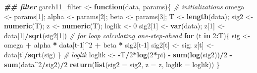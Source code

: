 \documentclass[
]{book}
\newenvironment{Shaded}{\begin{snugshade}}{\end{snugshade}}
\newcommand{\AttributeTok}[1]{\textcolor[rgb]{0.13,0.29,0.53}{#1}}
\newcommand{\CommentTok}[1]{\textcolor[rgb]{0.56,0.35,0.01}{\textit{#1}}}
\newcommand{\ControlFlowTok}[1]{\textcolor[rgb]{0.13,0.29,0.53}{\textbf{#1}}}
\newcommand{\DecValTok}[1]{\textcolor[rgb]{0.00,0.00,0.81}{#1}}
\newcommand{\DocumentationTok}[1]{\textcolor[rgb]{0.56,0.35,0.01}{\textbf{\textit{#1}}}}
\newcommand{\FunctionTok}[1]{\textcolor[rgb]{0.13,0.29,0.53}{\textbf{#1}}}
\newcommand{\NormalTok}[1]{#1}
\newcommand{\OtherTok}[1]{\textcolor[rgb]{0.56,0.35,0.01}{#1}}
\newcommand{\SpecialCharTok}[1]{\textcolor[rgb]{0.81,0.36,0.00}{\textbf{#1}}}
\begin{document}
\begin{Shaded}
\begin{Highlighting}[]
\DocumentationTok{\#\# filter }
\NormalTok{garch11\_filter }\OtherTok{\textless{}{-}} \ControlFlowTok{function}\NormalTok{(data, params)\{}
  \CommentTok{\# initializations}
\NormalTok{  omega }\OtherTok{\textless{}{-}}\NormalTok{ params[}\DecValTok{1}\NormalTok{]; }
\NormalTok{  alpha }\OtherTok{\textless{}{-}}\NormalTok{ params[}\DecValTok{2}\NormalTok{]; }
\NormalTok{  beta }\OtherTok{\textless{}{-}}\NormalTok{ params[}\DecValTok{3}\NormalTok{];}
\NormalTok{  T }\OtherTok{\textless{}{-}} \FunctionTok{length}\NormalTok{(data);}
\NormalTok{  sig2 }\OtherTok{\textless{}{-}} \FunctionTok{numeric}\NormalTok{(T); }
\NormalTok{  z }\OtherTok{\textless{}{-}} \FunctionTok{numeric}\NormalTok{(T); }
\NormalTok{  loglik }\OtherTok{\textless{}{-}} \DecValTok{0}
\NormalTok{  sig2[}\DecValTok{1}\NormalTok{] }\OtherTok{\textless{}{-}} \FunctionTok{var}\NormalTok{(data); z[}\DecValTok{1}\NormalTok{] }\OtherTok{\textless{}{-}}\NormalTok{ data[}\DecValTok{1}\NormalTok{]}\SpecialCharTok{/}\FunctionTok{sqrt}\NormalTok{(sig2[}\DecValTok{1}\NormalTok{])}
  \CommentTok{\# for loop calculating one{-}step{-}ahead}
  \ControlFlowTok{for}\NormalTok{ (t }\ControlFlowTok{in} \DecValTok{2}\SpecialCharTok{:}\NormalTok{T)\{}
\NormalTok{    sig }\OtherTok{\textless{}{-}}\NormalTok{ omega }\SpecialCharTok{+}\NormalTok{ alpha }\SpecialCharTok{*}\NormalTok{ data[t}\DecValTok{{-}1}\NormalTok{]}\SpecialCharTok{\^{}}\DecValTok{2} \SpecialCharTok{+}\NormalTok{ beta }\SpecialCharTok{*}\NormalTok{ sig2[t}\DecValTok{{-}1}\NormalTok{]}
\NormalTok{    sig2[t] }\OtherTok{\textless{}{-}}\NormalTok{ sig; z[t] }\OtherTok{\textless{}{-}}\NormalTok{ data[t]}\SpecialCharTok{/}\FunctionTok{sqrt}\NormalTok{(sig)}
\NormalTok{  \}}
  \CommentTok{\# loglik}
\NormalTok{  loglik }\OtherTok{\textless{}{-}} \SpecialCharTok{{-}}\NormalTok{T}\SpecialCharTok{/}\DecValTok{2}\SpecialCharTok{*}\FunctionTok{log}\NormalTok{(}\DecValTok{2}\SpecialCharTok{*}\NormalTok{pi) }\SpecialCharTok{{-}} \FunctionTok{sum}\NormalTok{(}\FunctionTok{log}\NormalTok{(sig2))}\SpecialCharTok{/}\DecValTok{2} \SpecialCharTok{{-}} \FunctionTok{sum}\NormalTok{(data}\SpecialCharTok{\^{}}\DecValTok{2}\SpecialCharTok{/}\NormalTok{sig2)}\SpecialCharTok{/}\DecValTok{2}
  \FunctionTok{return}\NormalTok{(}\FunctionTok{list}\NormalTok{(}\AttributeTok{sig2 =}\NormalTok{ sig2, }\AttributeTok{z =}\NormalTok{ z, }\AttributeTok{loglik =}\NormalTok{ loglik))}
\NormalTok{\}}
\end{Highlighting}
\end{Shaded}
\end{document}
